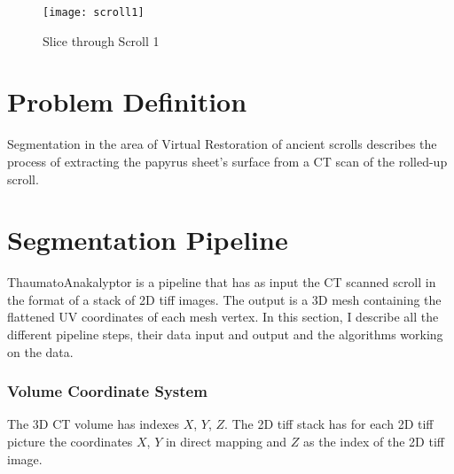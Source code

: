 \documentclass[peerreview]{IEEEtran}
\begin{document}
%
%
\begin{figure}[!h]
\centering
\texttt{[image: scroll1]} 
\caption{Slice through Scroll 1}
\label{fig_sim}
\end{figure}



\section{Problem Definition}
Segmentation in the area of Virtual Restoration of ancient scrolls describes the process of extracting the papyrus sheet's surface from a CT scan of the rolled-up scroll.

\section{Segmentation Pipeline}
ThaumatoAnakalyptor is a pipeline that has as input the CT scanned scroll in the format of a stack of 2D tiff images. The output is a 3D mesh containing the flattened UV coordinates of each mesh vertex.
In this section, I describe all the different pipeline steps, their data input and output and the algorithms working on the data.

\subsubsection{Volume Coordinate System}
The 3D CT volume has indexes $X$, $Y$, $Z$. The 2D tiff stack has for each 2D tiff picture the coordinates $X$, $Y$ in direct mapping and $Z$ as the index of the 2D tiff image.
\end{document}
